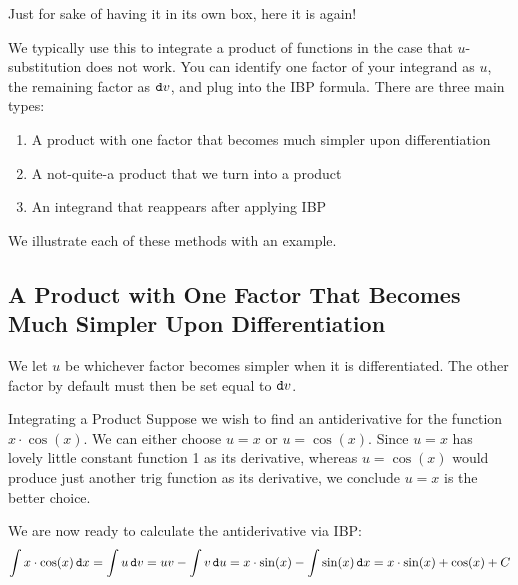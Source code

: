 Just for sake of having it in its own box, here it is again!
    
 We typically use this to integrate a product of functions in the case that $u$-substitution does not work.  You can identify one factor of your integrand as $u$, the remaining factor as $\mathop{}\!\mathtt{d} v$, and plug into the IBP formula.  There are three main types:

\begin{enumerate}
\item A product with one factor that becomes much simpler upon differentiation
\item A not-quite-a product that we turn into a product
\item An integrand that reappears after applying IBP
\end{enumerate} We illustrate each of these methods with an example.

\subsection{A Product with One Factor That Becomes Much Simpler Upon Differentiation}\label{simpleproduct}  We let $u$ be whichever factor becomes simpler when it is differentiated.  The other factor by default must then be set equal to $\mathop{}\!\mathtt{d} v$.  
\begin{example}{Integrating a Product}\label{ucosu}
  Suppose we wish to find an antiderivative for the function $x\cdot \cos(x)$.  We can either choose $u=x$ or $u=\cos(x)$.  Since $u=x$ has lovely little constant function 1 as its derivative, whereas $u=\cos(x)$ would produce just another trig function as its derivative, we conclude $u=x$ is the better choice.  


We are now ready to calculate the antiderivative via IBP:
$$\int x\cdot \cos(x) \mathop{}\!\mathtt{d} x = \int u \mathop{}\!\mathtt{d} v = uv-\int v \mathop{}\!\mathtt{d} u = x\cdot \sin(x) - \int \sin(x) \mathop{}\!\mathtt{d} x = x\cdot \sin(x) +\cos(x)+C$$

\end{example}

